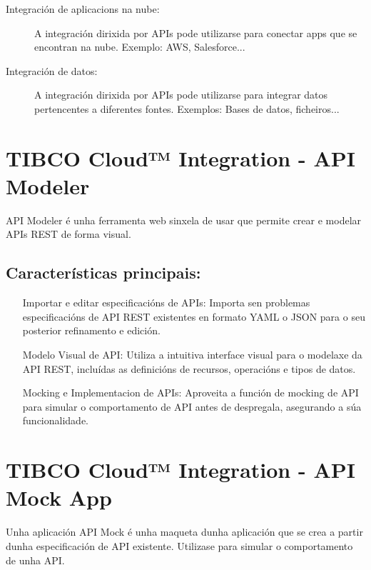 \begin{description}
    \item[Integración de aplicacions na nube:] A integración dirixida por APIs pode utilizarse para conectar apps que se encontran na nube. Exemplo: AWS, Salesforce...
    
    \item[Integración de datos:] A integración dirixida por APIs pode utilizarse para integrar datos pertencentes a diferentes fontes. Exemplos: Bases de datos, ficheiros...
\end{description}

\section{TIBCO Cloud™ Integration - API Modeler}

API Modeler é unha ferramenta web sinxela de usar que permite crear e modelar APIs REST de forma visual.

\subsection{Características principais:}

\begin{itemize}
    \item[Importar e editar especificacións de APIs:] Importa sen problemas especificacións de API REST existentes en formato YAML o JSON para o seu posterior refinamento e edición.
    
    \item[Modelo Visual de API:] Utiliza a intuitiva interface visual para o modelaxe da API REST, incluídas as definicións de recursos, operacións e tipos de datos.
    
    \item[Mocking e Implementacion de APIs:] Aproveita a función de mocking de API para simular o comportamento de API antes de despregala, asegurando a súa funcionalidade.
\end{itemize}

\section{TIBCO Cloud™ Integration - API Mock App}

Unha aplicación API Mock é unha maqueta dunha aplicación que se crea a partir dunha especificación de API existente. Utilizase para simular o comportamento de unha API. 

